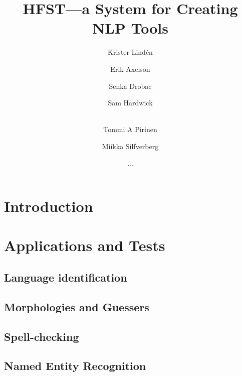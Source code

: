 \documentclass{llncs}
\begin{document}
%
\title{HFST---a System for Creating NLP Tools}
%
\author{Krister Lind\'{e}n \and Erik Axelson \and Senka Drobac \and Sam Hardwick \and\\
Tommi A Pirinen \and Miikka Silfverberg \and ...}


\maketitle


\begin{abstract}
\end{abstract}


\section*{Introduction}

\section{Applications and Tests}\label{hfst:structural-layout}

\subsection{Language identification}

\subsection{Morphologies and Guessers}

\subsection{Spell-checking}


\subsection{Named Entity Recognition}
\end{document}
